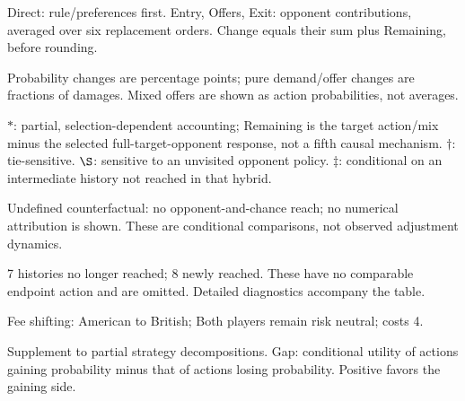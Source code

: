 \documentclass[10pt]{article}
\begin{document}
{\footnotesize Direct: rule/preferences first. Entry, Offers, Exit: opponent contributions, averaged over six replacement orders. Change equals their sum plus Remaining, before rounding.\par
Probability changes are percentage points; pure demand/offer changes are fractions of damages. Mixed offers are shown as action probabilities, not averages.\par
$*$: partial, selection-dependent accounting; Remaining is the target action/mix minus the selected full-target-opponent response, not a fifth causal mechanism. $\dagger$: tie-sensitive. $\S$: sensitive to an unvisited opponent policy. $\ddagger$: conditional on an intermediate history not reached in that hybrid.\par
Undefined counterfactual: no opponent-and-chance reach; no numerical attribution is shown. These are conditional comparisons, not observed adjustment dynamics.\par
7 histories no longer reached; 8 newly reached. These have no comparable endpoint action and are omitted. Detailed diagnostics accompany the table.}\par
{}\par
Fee shifting: American to British; Both players remain risk neutral; costs 4.\par
{\small Supplement to partial strategy decompositions. Gap: conditional utility of actions gaining probability minus that of actions losing probability. Positive favors the gaining side.}\par
\end{document}
